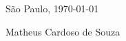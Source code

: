 \documentclass[10pt,A4,english]{article}
\begin{document}
\begin{paracol}{2}
\begin{rightcolumn}
\mbox{}
\vfill
\mbox{}
\vfill
\mbox{}
\vfill
\mbox{}
\vfill
\mbox{}
\vfill
\mbox{}
\vfill
\mbox{}
\vfill
\mbox{}
\vfill
\mbox{}
\vfill
\mbox{}
\vfill
\mbox{}


São Paulo, \today \hspace{1cm} \hrulefill

\hspace*{30mm}\phantom{Lorem, \today }Matheus Cardoso de Souza

\end{rightcolumn}
\end{paracol}
\end{document}
